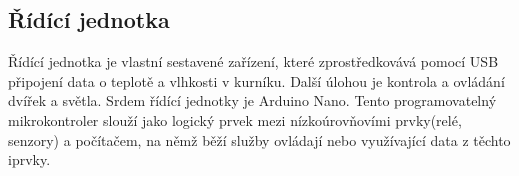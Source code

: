 
\subsection{Řídící jednotka}\label{subsec:ridici-jednotka}
Řídící jednotka je vlastní sestavené zařízení, které zprostředkovává pomocí USB připojení data o teplotě a vlhkosti v kurníku.
Další úlohou je kontrola a ovládání dvířek a světla.
Srdem řídící jednotky je Arduino Nano.
Tento programovatelný mikrokontroler slouží jako logický prvek mezi nízkoúrovňovími prvky(relé, senzory) a počítačem, na němž běží služby ovládají nebo využívající data z těchto iprvky.

%
%
%
%

